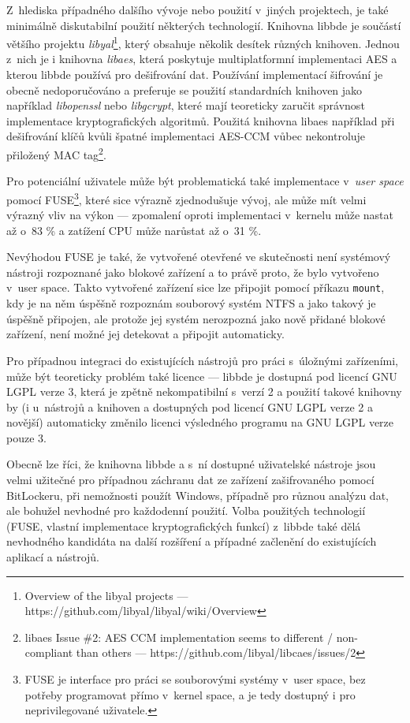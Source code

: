 Z~hlediska případného dalšího vývoje nebo použití v~jiných projektech, je také mi\-ni\-mál\-ně diskutabilní použití některých technologií. Knihovna libbde je součástí většího projektu \emph{libyal}\footnote{Overview of the libyal projects --- https://github.com/libyal/libyal/wiki/Overview}, který obsahuje několik desítek různých knihoven. Jednou z~nich je i knihovna \emph{libaes}, která poskytuje multiplatformní implementaci AES a kterou libbde používá pro dešifrování dat. Používání  implementací šifrování je obecně nedoporučováno a preferuje se použití standardních knihoven jako například \emph{libopenssl} nebo \emph{libgcrypt}, které mají teoreticky zaručit správnost implementace kryptografických algoritmů. Použitá knihovna libaes například při dešifrování klíčů kvůli špatné implementaci AES-CCM vůbec nekontroluje přiložený MAC tag\footnote{libaes Issue \#2: AES CCM implementation seems to different / non-compliant than others --- https://github.com/libyal/libcaes/issues/2}.

Pro potenciální uživatele může být problematická také implementace v~\emph{user space} pomocí FUSE\footnote{FUSE je interface pro práci se souborovými systémy v~user space, bez potřeby programovat přímo v~kernel space, a je tedy dostupný i pro neprivilegované uživatele\cite{Singh2014}.}, které sice výrazně zjednodušuje vývoj, ale může mít velmi výrazný vliv na výkon --- zpomalení oproti implementaci v~kernelu může nastat až o~83 \% a zatížení CPU může narůstat až o~31 \%\cite{Vangoor2017}.

Nevýhodou FUSE je také, že vytvořené otevřené  ve skutečnosti není systémový nástroji rozpoznané jako blokové zařízení a to právě proto, že bylo vytvořeno v~user space. Takto vytvořené zařízení sice lze připojit pomocí příkazu \texttt{mount}, kdy je na něm úspěšně rozpoznám souborový systém NTFS a jako takový je úspěšně připojen, ale protože jej systém nerozpozná jako nově přidané blokové zařízení, není možné jej detekovat a připojit automaticky.

Pro případnou integraci do existujících nástrojů pro práci s~úložnými zařízeními, může být teoreticky problém také licence --- libbde je dostupná pod licencí GNU LGPL verze 3, která je zpětně nekompatibilní s~verzí 2 a použití takové knihovny by (i u~nástrojů a knihoven a dostupných pod licencí GNU LGPL verze 2 a novější) automaticky změnilo licenci výsledného programu na GNU LGPL verze pouze 3\cite{GNU2019}.

Obecně lze říci, že knihovna libbde a s~ní dostupné uživatelské nástroje jsou velmi užitečné pro případnou záchranu dat ze zařízení zašifrovaného pomocí BitLockeru, při nemožnosti použít Windows, případně pro různou analýzu dat, ale bohužel nevhodné pro každodenní použití. Volba použitých technologií (FUSE, vlastní implementace kryptografických funkcí) z~libbde také dělá nevhodného kandidáta na další rozšíření a případné začlenění do existujících aplikací a nástrojů.

